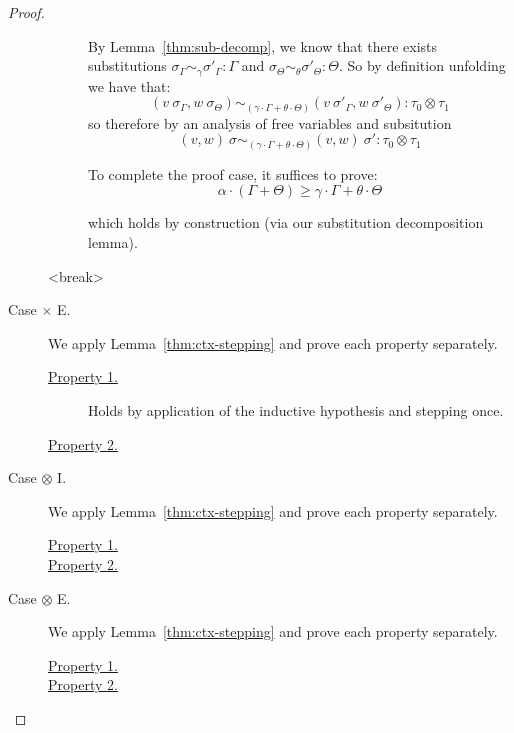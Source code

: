 \begin{proof}
\begin{description}
\begin{description}
          By Lemma~\ref{thm:sub-decomp}, we know that there exists substitutions
          $\sigma_{\Gamma} \sim_{\gamma} \sigma'_{\Gamma} : \Gamma$
          and
          $\sigma_{\Theta} \sim_{\theta} \sigma'_{\Theta} : \Theta$.
          So by definition unfolding we have that:
          $$
          (v~\sigma_{\Gamma}, w~\sigma_{\Theta}) 
            \sim_{(\gamma \cdot \Gamma + \theta \cdot \Theta)} 
          (v~\sigma'_{\Gamma}, w~\sigma'_{\Theta})
          : \tau_0 \otimes \tau_1
          $$
          so therefore by an analysis of free variables and subsitution
          $$
          (v, w)~\sigma 
            \sim_{(\gamma \cdot \Gamma + \theta \cdot \Theta)} 
          (v, w)~\sigma'
          : \tau_0 \otimes \tau_1
          $$

          To complete the proof case, it suffices to prove:
          $$\alpha \cdot (\Gamma + \Theta) \geq \gamma \cdot \Gamma + \theta \cdot \Theta$$

          which holds by construction (via our substitution decomposition lemma).
      \end{description}

    <break>

    \item[Case $\times$ E.] 
      We apply Lemma~\ref{thm:ctx-stepping} and prove each property separately.
      \begin{description}
        \item[\underline{Property 1.}]
          Holds by application of the inductive hypothesis and stepping once.
        \item[\underline{Property 2.}]
      \end{description}

    \item[Case $\otimes$ I.] 
      We apply Lemma~\ref{thm:ctx-stepping} and prove each property separately.
      \begin{description}
        \item[\underline{Property 1.}]
        \item[\underline{Property 2.}]
      \end{description}

    \item[Case $\otimes$ E.] 
      We apply Lemma~\ref{thm:ctx-stepping} and prove each property separately.
      \begin{description}
        \item[\underline{Property 1.}]
        \item[\underline{Property 2.}]
      \end{description}


\end{description}
\end{proof}
